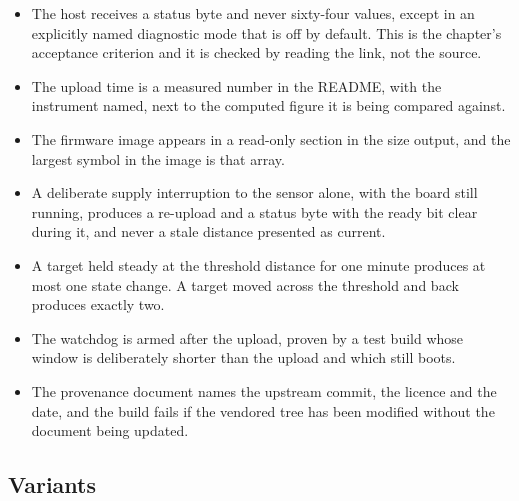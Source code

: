 \begin{itemize}
\item The host receives a status byte and never sixty-four values, except in an
explicitly named diagnostic mode that is off by default. This is the chapter's
acceptance criterion and it is checked by reading the link, not the source.
\item The upload time is a measured number in the README, with the instrument
named, next to the computed figure it is being compared against.
\item The firmware image appears in a read-only section in the size output, and
the largest symbol in the image is that array.
\item A deliberate supply interruption to the sensor alone, with the board still
running, produces a re-upload and a status byte with the ready bit clear during
it, and never a stale distance presented as current.
\item A target held steady at the threshold distance for one minute produces at
most one state change. A target moved across the threshold and back produces
exactly two.
\item The watchdog is armed after the upload, proven by a test build whose
window is deliberately shorter than the upload and which still boots.
\item The provenance document names the upstream commit, the licence and the
date, and the build fails if the vendored tree has been modified without the
document being updated.
\end{itemize}

\subsection*{Variants}

